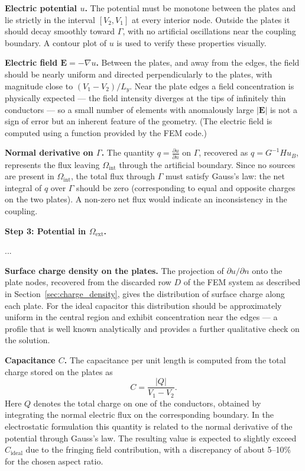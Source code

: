 \documentclass[11pt,onecolumn]{article}
\begin{document}
\textbf{Electric potential $u$.} 
The potential must be monotone between the plates and lie strictly in the interval $[V_2, V_1]$ 
at every interior node. Outside the plates it should decay smoothly toward $\Gamma$, with no 
artificial oscillations near the coupling boundary. A contour plot of $u$ is used to verify 
these properties visually.

\textbf{Electric field $\mathbf{E} = -\nabla u$.}
Between the plates, and away from the edges, the field should be nearly uniform and directed 
perpendicularly to the plates, with magnitude close to $(V_1 - V_2)/L_y$. Near the plate edges 
a field concentration is physically expected — the field intensity diverges at the tips of 
infinitely thin conductors — so a small number of elements with anomalously large $|\mathbf{E}|$ 
is not a sign of error but an inherent feature of the geometry. (The electric field is computed using a function provided by the FEM code.)

\textbf{Normal derivative on $\Gamma$.}
The quantity $q = \frac{\partial u}{\partial n}$ on $\Gamma$, recovered as $q = G^{-1} H u_B$, represents the flux leaving $\Omega_{\mathrm{int}}$ through the artificial boundary. 
Since no sources are present in $\Omega_{\mathrm{int}}$, the total flux through 
$\Gamma$ must satisfy Gauss's law: the net integral of $q$ over $\Gamma$ should be zero 
(corresponding to equal and opposite charges on the two plates). 
A non-zero net flux would indicate an inconsistency in the coupling.

{\color{cyan}

\textbf{Step 3: Potential in $\Omega_{\text{ext}}$.}

...
}


\textbf{Surface charge density on the plates.}
The projection of $\partial u / \partial n$ onto the plate nodes, recovered from the discarded 
row $D$ of the FEM system as described in Section~\ref{sec:charge_density}, gives the 
distribution of surface charge along each plate. For the ideal capacitor this distribution 
should be approximately uniform in the central region and exhibit concentration near the 
edges — a profile that is well known analytically and provides a further qualitative check 
on the solution.

{\color{cyan} 

\textbf{Capacitance $C$.}
The capacitance per unit length is computed from the total charge stored on the plates as
\begin{equation}
    C = \frac{|Q|}{V_1 - V_2}.
\end{equation}
Here $Q$ denotes the total charge on one of the conductors, obtained by integrating the normal
electric flux on the corresponding boundary. In the electrostatic formulation this quantity is
related to the normal derivative of the potential through Gauss's law. The resulting value is
expected to slightly exceed $C_{\text{ideal}}$ due to the fringing field contribution, with a
discrepancy of about 5--10\% for the chosen aspect ratio.
}
\end{document}
